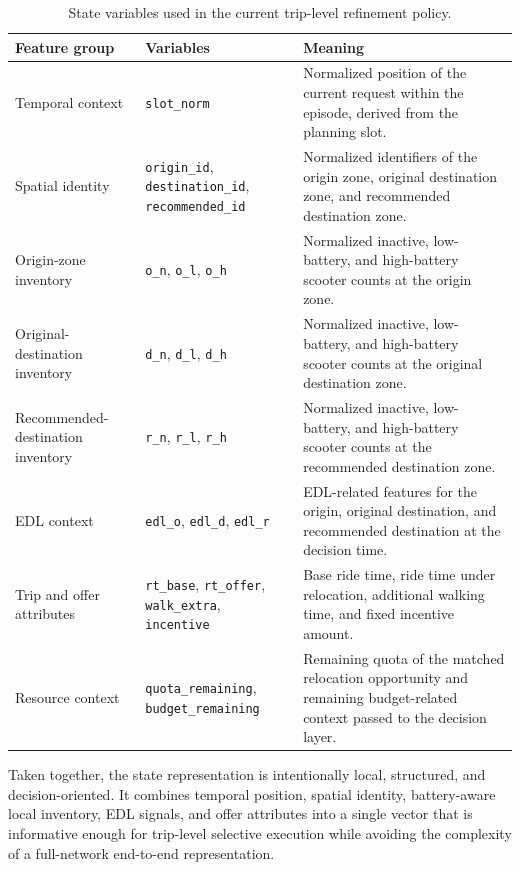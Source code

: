 \begin{table}[H]
\centering
\caption{State variables used in the current trip-level refinement policy.}
\label{tab:state-features}
\begin{tabular}{p{3.2cm}p{5.4cm}p{5.2cm}}
\toprule
\textbf{Feature group} & \textbf{Variables} & \textbf{Meaning} \\
\midrule
Temporal context
& \texttt{slot\_norm}
& Normalized position of the current request within the episode, derived from the planning slot. \\

Spatial identity
& \texttt{origin\_id}, \texttt{destination\_id}, \texttt{recommended\_id}
& Normalized identifiers of the origin zone, original destination zone, and recommended destination zone. \\

Origin-zone inventory
& \texttt{o\_n}, \texttt{o\_l}, \texttt{o\_h}
& Normalized inactive, low-battery, and high-battery scooter counts at the origin zone. \\

Original-destination inventory
& \texttt{d\_n}, \texttt{d\_l}, \texttt{d\_h}
& Normalized inactive, low-battery, and high-battery scooter counts at the original destination zone. \\

Recommended-destination inventory
& \texttt{r\_n}, \texttt{r\_l}, \texttt{r\_h}
& Normalized inactive, low-battery, and high-battery scooter counts at the recommended destination zone. \\

EDL context
& \texttt{edl\_o}, \texttt{edl\_d}, \texttt{edl\_r}
& EDL-related features for the origin, original destination, and recommended destination at the decision time. \\

Trip and offer attributes
& \texttt{rt\_base}, \texttt{rt\_offer}, \texttt{walk\_extra}, \texttt{incentive}
& Base ride time, ride time under relocation, additional walking time, and fixed incentive amount. \\

Resource context
& \texttt{quota\_remaining}, \texttt{budget\_remaining}
& Remaining quota of the matched relocation opportunity and remaining budget-related context passed to the decision layer. \\
\bottomrule
\end{tabular}
\end{table}


Taken together, the state representation is intentionally local, structured, and decision-oriented. It combines temporal position, spatial identity, battery-aware local inventory, EDL signals, and offer attributes into a single vector that is informative enough for trip-level selective execution while avoiding the complexity of a full-network end-to-end representation.



